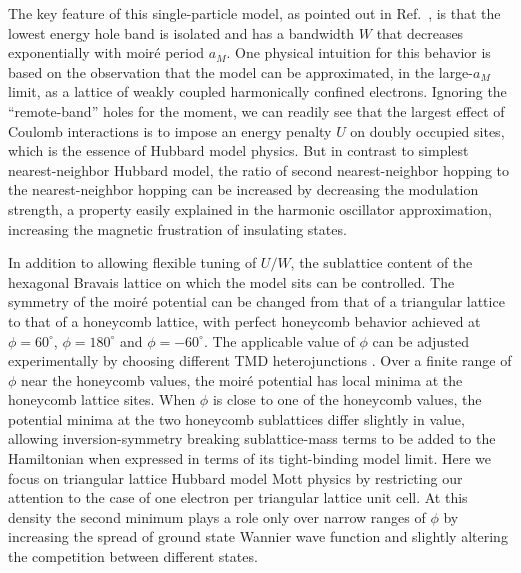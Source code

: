 \documentclass[%
 reprint,
 superscriptaddress,
 amsmath,amssymb,
 aps,
 prx,
 floatfix,
]{revtex4-2}
\newcommand{\<}{\langle}
\renewcommand{\>}{\rangle}
\renewcommand{\(}{\left(}
\renewcommand{\)}{\right)}
\renewcommand{\[}{\left[}
\renewcommand{\]}{\right]}
\begin{document}
The key feature of this single-particle model, as pointed out in Ref.~\cite{fengchengHubbard}, 
is that the lowest energy hole band is isolated and has a bandwidth $W$ that 
decreases exponentially with moir\'e period $a_M$. 
One physical intuition for this behavior is based on the observation that the 
model can be 
approximated, in the large-$a_M$ limit, as a lattice of weakly coupled harmonically confined electrons. 
Ignoring the ``remote-band'' holes for the moment, we can readily see that the largest effect of 
Coulomb interactions is to impose an energy penalty $U$ on doubly occupied sites,
which is the essence of Hubbard model physics. But in contrast to simplest nearest-neighbor Hubbard model,
the ratio of second nearest-neighbor hopping to the nearest-neighbor hopping can be increased by decreasing the modulation strength, a property easily explained in the harmonic oscillator approximation, increasing the magnetic
frustration of insulating states.

In addition to allowing flexible tuning of $U/W$, the sublattice content of the hexagonal Bravais 
lattice on which the model sits can be controlled.  The symmetry of the moir\'e potential 
can be changed from that of a triangular lattice to that of a honeycomb lattice, with perfect 
honeycomb behavior achieved at $\phi=60^{\circ}$, $\phi=180^{\circ}$ and $\phi=-60^{\circ}$.
The applicable value of $\phi$ can be adjusted experimentally by 
choosing different TMD heterojunctions \cite{liangfuCTI, nicolas2020ed}. 
Over a finite range of $\phi$ near the honeycomb values, the moir\'e potential has local minima 
at the honeycomb lattice sites.  When $\phi$ is close to one of the honeycomb values,
the potential minima at the two honeycomb sublattices differ slightly in value,
allowing inversion-symmetry breaking sublattice-mass terms to be added to the 
Hamiltonian when expressed in terms of its tight-binding model limit.
Here we focus on triangular lattice Hubbard model Mott physics by 
restricting our attention to the case of one electron per triangular lattice unit cell.
At this density the second minimum plays a role only over narrow 
ranges of $\phi$ by increasing the spread of ground state Wannier wave function and 
slightly altering the competition between different states.
\end{document}
